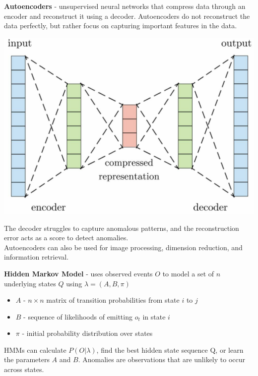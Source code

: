 \documentclass[10pt,landscape]{article}
\begin{document}
\begin{multicols}{3}
        \vspace{1mm}
        \textbf{Autoencoders} - unsupervised neural networks that compress data through an encoder and reconstruct it using a decoder. Autoencoders do not reconstruct the data perfectly, but rather focus on capturing important features in the data.
        \begin{center}
            \vspace{-2mm}
            \includegraphics[scale = .19]{images/autoencodeer3.JPG}
            \vspace{-2mm}
        \end{center}
        The decoder struggles to capture anomalous patterns, and the reconstruction error acts as a score to detect anomalies.
        \\
        \smallskip
        Autoencoders can also be used for image processing, dimension reduction, and information retrieval.
        \smallskip

        \textbf{Hidden Markov Model} - uses observed events $O$ to model a set of $n$ underlying states $Q$ using $\lambda = (A,B,\pi)$
        \begin{itemize}[label={--},leftmargin=4mm]
            \itemsep -.4mm
            \item $A$ - $n\times n$ matrix of transition probabilities from state $i$ to $j$ \item $B$ - sequence of likelihoods of emitting $o_t$ in state $i$
            \item $\pi$ - initial probability distribution over states
        \end{itemize}
        HMMs can calculate $P(O|\lambda)$, find the best hidden state sequence Q, or learn the parameters $A$ and $B$.
        Anomalies are observations that are unlikely to occur across states.


\end{multicols}
\end{document}
